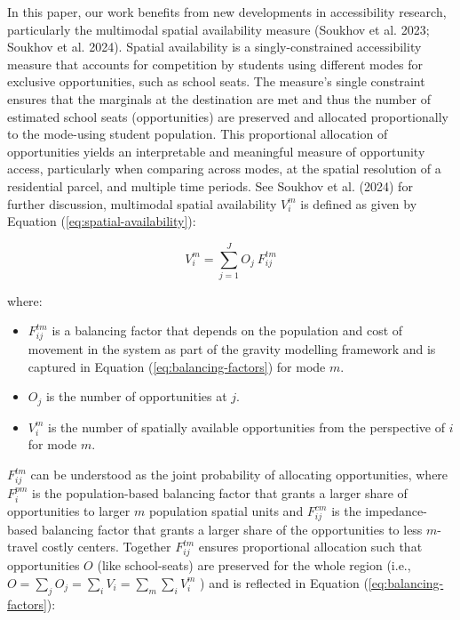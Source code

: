 \documentclass[
default
]{sn-jnl}
\providecommand{\tightlist}{%
  \setlength{\itemsep}{0pt}\setlength{\parskip}{0pt}}\usepackage{longtable,booktabs,array}
\begin{document}
In this paper, our work benefits from new developments in accessibility
research, particularly the multimodal spatial availability measure
(Soukhov et al. 2023; Soukhov et al. 2024). Spatial availability is a
singly-constrained accessibility measure that accounts for competition
by students using different modes for exclusive opportunities, such as
school seats. The measure's single constraint ensures that the marginals
at the destination are met and thus the number of estimated school seats
(opportunities) are preserved and allocated proportionally to the
mode-using student population. This proportional allocation of
opportunities yields an interpretable and meaningful measure of
opportunity access, particularly when comparing across modes, at the
spatial resolution of a residential parcel, and multiple time periods.
See Soukhov et al. (2024) for further discussion, multimodal spatial
availability \(V_{i}^m\) is defined as given by Equation
(\ref{eq:spatial-availability}):

\begin{equation}
\label{eq:spatial-availability}
V_{i}^{m} = \sum_{j=1}^J O_j\ F^{tm}_{ij}
\end{equation}

\noindent where:

\begin{itemize}
\tightlist
\item
  \(F^{tm}_{ij}\) is a balancing factor that depends on the population
  and cost of movement in the system as part of the gravity modelling
  framework and is captured in Equation (\ref{eq:balancing-factors}) for
  mode \(m\).
\item
  \(O_j\) is the number of opportunities at \(j\).
\item
  \(V_i^m\) is the number of spatially available opportunities from the
  perspective of \(i\) for mode \(m\).
\end{itemize}

\(F^{tm}_{ij}\) can be understood as the joint probability of allocating
opportunities, where \(F^{pm}_{i}\) is the population-based balancing
factor that grants a larger share of opportunities to larger \(m\)
population spatial units and \(F^{cm}_{ij}\) is the impedance-based
balancing factor that grants a larger share of the opportunities to less
\(m\)-travel costly centers. Together \(F^{tm}_{ij}\) ensures
proportional allocation such that opportunities \(O\) (like
school-seats) are preserved for the whole region (i.e.,
\(O = \sum_{j} O_j = \sum_{i} V_i = \sum_{m}\sum_{i} V_i^m\) ) and is
reflected in Equation (\ref{eq:balancing-factors}):
\end{document}
